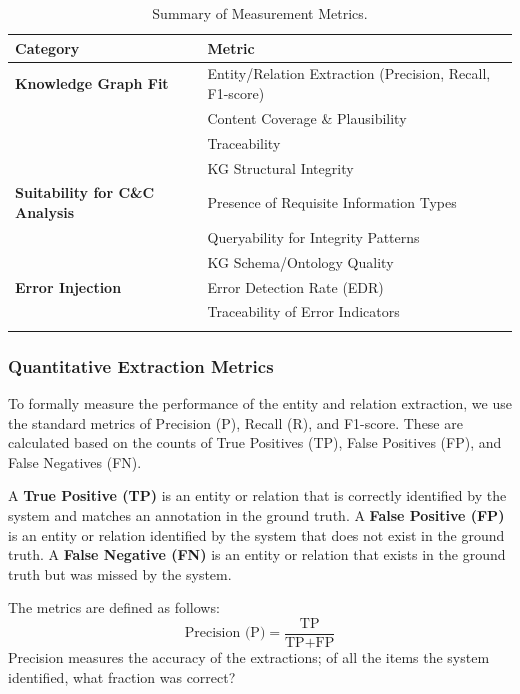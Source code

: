 \begin{table}[htbp]
\centering
{}
\begin{tabularx}{\textwidth}{@{} lX @{}}
\toprule
\textbf{Category} & \textbf{Metric} \\
\midrule
\addlinespace
\textbf{Knowledge Graph Fit} & Entity/Relation Extraction (Precision, Recall, F1-score) \\
& Content Coverage \& Plausibility \\
& Traceability \\
& KG Structural Integrity \\
\addlinespace
\hline
\addlinespace
\textbf{Suitability for C\&C Analysis} & Presence of Requisite Information Types \\
& Queryability for Integrity Patterns \\
& KG Schema/Ontology Quality \\
\addlinespace
\hline
\addlinespace
\textbf{Error Injection} & Error Detection Rate (EDR) \\
& Traceability of Error Indicators \\
\addlinespace
\bottomrule
\end{tabularx}
\caption{Summary of Measurement Metrics.}
\label{tab:measurement_metrics_summary}
\end{table}

\subsubsection{Quantitative Extraction Metrics}
To formally measure the performance of the entity and relation extraction, we use the standard metrics of Precision (P), Recall (R), and F1-score. These are calculated based on the counts of True Positives (TP), False Positives (FP), and False Negatives (FN).

A \textbf{True Positive (TP)} is an entity or relation that is correctly identified by the system and matches an annotation in the ground truth. A \textbf{False Positive (FP)} is an entity or relation identified by the system that does not exist in the ground truth. A \textbf{False Negative (FN)} is an entity or relation that exists in the ground truth but was missed by the system.

The metrics are defined as follows:
\begin{equation}
    \text{Precision (P)} = \frac{\text{TP}}{\text{TP} + \text{FP}}
\end{equation}
Precision measures the accuracy of the extractions; of all the items the system identified, what fraction was correct?

